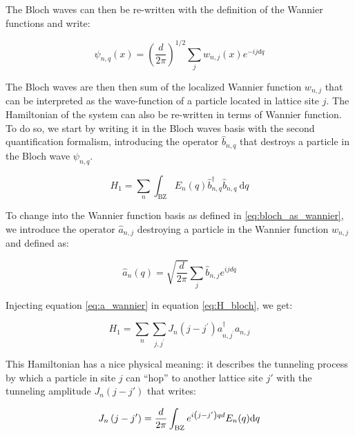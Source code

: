 The Bloch waves can then be re-written with the definition of the Wannier functions and write:

\begin{equation}
    \psi_{n, q}(x)=\left(\frac{d}{2 \pi}\right)^{1 / 2} \sum_{j} w_{n, j}(x) e^{-i j d q}
    \label{eq:bloch_as_wannier}
\end{equation}

The Bloch waves are then then sum of the localized Wannier function $w_{n, j}$ that can be interpreted as the wave-function of a particle located in lattice site $j$. The Hamiltonian of the system can also be re-written in terms of Wannier function. To do so, we start by writing it in the Bloch waves basis with the second quantification formalism, introducing the operator $\hat{b}_{n,q}$ that destroys a particle in the Bloch wave $\psi_{n,q}$.

\begin{equation}
    H_{1}=\sum_{n} \int_{\mathrm{BZ}} E_{n}(q) \hat{b}_{n, q}^{\dagger} \hat{b}_{n, q} \mathrm{~d} q
    \label{eq:H_bloch}
\end{equation}

To change into the Wannier function basis as defined in \ref{eq:bloch_as_wannier}, we introduce the operator $\hat{a}_{n,j}$ destroying a particle in the Wannier function $w_{n,j}$ and defined as:

\begin{equation}
    \hat{a}_{n}(q)=\sqrt{\frac{d}{2 \pi}} \sum_{j} \hat{b}_{n, j} e^{i j d q}
    \label{eq:a_wannier}
\end{equation}

\noindent Injecting equation \ref{eq:a_wannier} in equation \ref{eq:H_bloch}, we get:

\begin{equation}
    H_{1}=\sum_{n} \sum_{j, j^{\prime}} J_{n}\left(j-j^{\prime}\right) a_{n, j^{\prime}}^{\dagger} a_{n,j}
    \label{eq:H_Jn}
\end{equation}

\noindent This Hamiltonian has a nice physical meaning: it describes the tunneling process by which a particle in site $j$ can ``hop'' to another lattice site $j'$ with the tunneling amplitude $J_n (j-j')$ that writes:

\begin{equation}
    J_{n}\left(j-j^{\prime}\right)=\frac{d}{2 \pi} \int_{\rm{BZ}} e^{i\left(j-j^{\prime}\right) q d} E_{n}(q) \mathrm{d} q
\end{equation}

